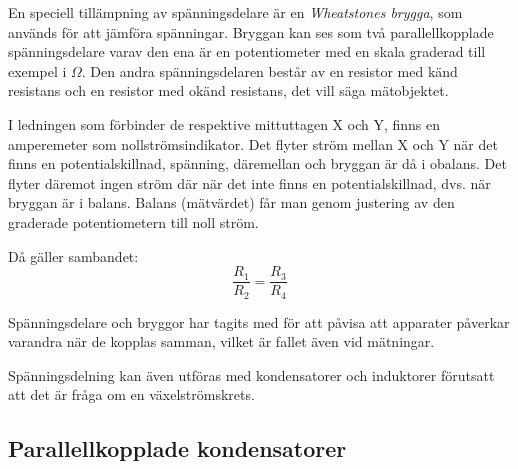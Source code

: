 En speciell tillämpning av spänningsdelare är en \emph{Wheatstones brygga},
som används för att jämföra spänningar.
Bryggan kan ses som två parallellkopplade spänningsdelare varav den ena är en
potentiometer med en skala graderad till exempel i \(\Omega\).
Den andra spänningsdelaren består av en resistor med känd resistans och en
resistor med okänd resistans, det vill säga mätobjektet.

I ledningen som förbinder de respektive mittuttagen X och Y, finns en
amperemeter som nollströmsindikator.
Det flyter ström mellan X och Y när det finns en potentialskillnad,
spänning, däremellan och bryggan är då i obalans.
Det flyter däremot ingen ström där när det inte finns en
potentialskillnad, dvs. när bryggan är i balans.
Balans (mätvärdet) får man genom justering av den graderade
potentiometern till noll ström.

Då gäller sambandet:
\[   \frac{R_1}{R_2} = \frac{R_3}{R_4}   \]

Spänningsdelare och bryggor har tagits med för att påvisa att apparater påverkar
varandra när de kopplas samman, vilket är fallet även vid mätningar.

Spänningsdelning kan även utföras med kondensatorer och induktorer förutsatt att
det är fråga om en växelströmskrets.

\subsection{Parallellkopplade kondensatorer}

